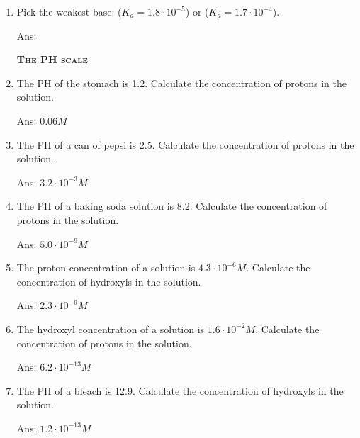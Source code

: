 \documentclass[main.tex]{subfiles}
\begin{document}
\begin{multicols*}{2}
\begin{enumerate}
\item Pick the weakest base:  ($K_a=1.8\cdot 10^{-5}$) or  ($K_a=1.7\cdot 10^{-4}$).
\begin{flushright}\small Ans:   \end{flushright}

{\raggedright\textsc{\textbf{The PH scale}}\par}

\item The PH of the stomach is 1.2. Calculate the concentration of protons in the solution.
\begin{flushright}\small Ans: $0.06M$  \end{flushright}

\item The PH of a can of pepsi is 2.5. Calculate the concentration of protons in the solution.
\begin{flushright}\small Ans: $3.2\cdot 10^{-3}M$  \end{flushright}

\item The PH of a baking soda solution is 8.2. Calculate the concentration of protons in the solution.
\begin{flushright}\small Ans: $5.0\cdot 10^{-9}M$  \end{flushright}

\item The proton concentration of a solution is $4.3\cdot 10^{-6}M$. Calculate the concentration of hydroxyls in the solution.
\begin{flushright}\small Ans: $2.3\cdot 10^{-9}M$  \end{flushright}

\item The hydroxyl concentration of a solution is $1.6\cdot 10^{-2}M$. Calculate the concentration of protons in the solution.
\begin{flushright}\small Ans: $6.2\cdot 10^{-13}M$  \end{flushright}

\item The PH of a bleach is 12.9. Calculate the concentration of hydroxyls in the solution.
\begin{flushright}\small Ans: $1.2\cdot 10^{-13}M$  \end{flushright}



\end{enumerate}
\end{multicols*}
\end{document}
